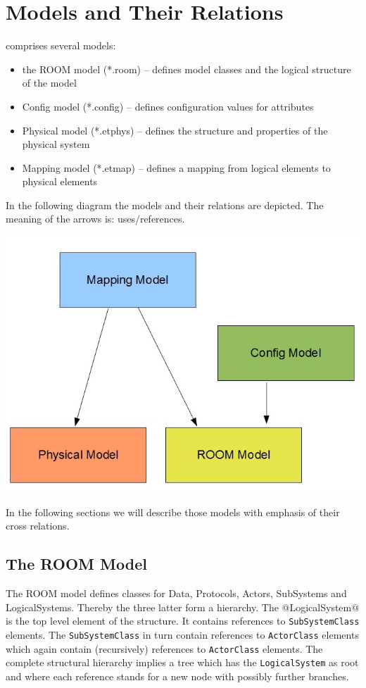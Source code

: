 \section{\eTrice{} Models and Their Relations}

\eTrice{} comprises several models:

\begin{itemize}
\item the ROOM model (*.room) -- defines model classes and the logical structure of the model
\item Config model (*.config) -- defines configuration values for attributes
\item Physical model (*.etphys) -- defines the structure and properties of the physical system
\item Mapping model (*.etmap) -- defines a mapping from logical elements to physical elements
\end{itemize}

In the following diagram the models and their relations are depicted. The meaning of the arrows is: 
uses/references.

\includegraphics[scale=0.4]{images/080-models.jpg}

In the following sections we will describe those models with emphasis of their cross relations.

\subsection{The ROOM Model}

The ROOM model defines classes for Data, Protocols, Actors, SubSystems and LogicalSystems.
Thereby the three latter form a hierarchy. The @LogicalSystem@ is the top level element of the structure. 
It contains references to \texttt{SubSystemClass} elements. The \texttt{SubSystemClass} in turn contain 
references to \texttt{ActorClass} elements which again contain (recursively) references to 
\texttt{ActorClass} elements. The complete structural hierarchy implies a tree which has the 
\texttt{LogicalSystem} as root and where each reference stands for a new node with possibly further 
branches.

